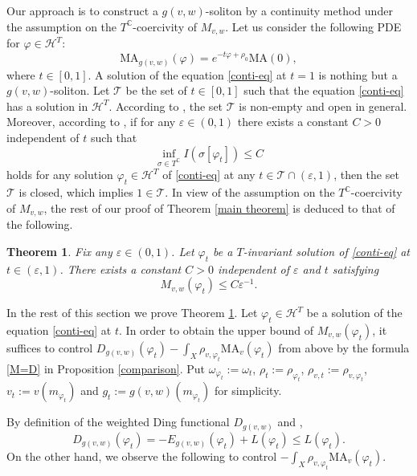 \documentclass[12pt]{amsart}
\numberwithin{equation}{section}%
\theoremstyle{plain}
\newtheorem{theorem}{Theorem}[section]
\theoremstyle{definition}
\newcommand{\e}{\varepsilon}
\newcommand{\MA}{\mathrm{MA}}
\renewcommand{\phi}{\varphi}
\renewcommand{\leq}{\leqslant}
\newcommand{\1}{\mathbf{1}}
\begin{document}
Our approach is to construct a $g(v,w)$-soliton 
by a continuity method under the assumption on
the $T^{\mathbb{C}}$-coercivity of $M_{v,w}$.
Let us consider the following PDE for $\phi\in\mathcal{H}^{T}$:
\begin{equation}\label{conti-eq}
\MA_{g(v,w)}(\phi)=e^{-t\phi+\rho_{0}}\MA(0),
\end{equation}
where $t\in [0,1]$.
A solution of the equation \eqref{conti-eq} at $t=1$ is nothing but a $g(v,w)$-soliton.
Let $\mathcal{T}$ be the set of $t\in[0,1]$ such that the equation \eqref{conti-eq}
has a solution in $\mathcal{H}^T$.
According to \cite[Section 3]{HN24},
the set $\mathcal{T}$ is non-empty and open in general.
Moreover, according to \cite[Section 5]{HN24},
if for any $\e\in(0,1)$ there exists a constant $C>0$ independent of $t$ such that
\begin{equation}
\inf_{\sigma\in T^{\mathbb{C}}}I(\sigma[\phi_{t}])\leq C
\end{equation}
holds for any solution $\phi_{t}\in\mathcal{H}^{T}$ of \eqref{conti-eq}
at any $t\in\mathcal{T}\cap(\e,1)$,
then the set $\mathcal{T}$ is closed, which implies $1\in\mathcal{T}$.
In view of the assumption on the $T^{\mathbb{C}}$-coercivity of $M_{v,w}$,
the rest of our proof of Theorem \ref{main theorem} is deduced to
that of the following.

\begin{theorem}\label{bound of M}
Fix any $\e\in(0,1)$.
Let $\phi_t$ be a $T$-invariant solution of \eqref{conti-eq} at $t\in(\e,1)$.
There exists a constant $C>0$ independent of $\e$ and $t$ satisfying
\begin{equation}\label{estimate of M}
M_{v,w}(\phi_t)\leq C\e^{-1}.
\end{equation}
\end{theorem}

In the rest of this section we prove Theorem \ref{bound of M}.
Let $\phi_{t}\in\mathcal{H}^T$ be a solution of the equation \eqref{conti-eq} at $t$.
In order to obtain the upper bound of $M_{v,w}(\phi_{t})$, 
it suffices to control $D_{g(v,w)}(\phi_{t}) -\int_{X}\rho_{v,\phi_{t}}\MA_{v}(\phi_{t})$
from above by the formula \eqref{M=D} in Proposition \ref{comparison}.
Put $\omega_{\phi_{t}}:=\omega_{t}$,
$\rho_{t}:=\rho_{\phi_{t}}$, $\rho_{v,t}:=\rho_{v,\phi_{t}}$,
$v_{t}:=v(m_{\phi_{t}})$ and $g_{t}:=g(v,w)(m_{\phi_{t}})$ for simplicity.

By definition of the weighted Ding functional $D_{g(v,w)}$ and \cite[Proposition 4.4]{HN24},
\begin{equation}\label{Dg-estimate}
D_{g(v,w)}(\phi_{t})=-E_{g(v,w)}(\phi_{t})+L(\phi_{t})\leq L(\phi_{t}).
\end{equation}
On the other hand, we observe the following to control 
$-\int_{X}\rho_{v,\phi_{t}}\MA_{v}(\phi_{t})$.
\end{document}
